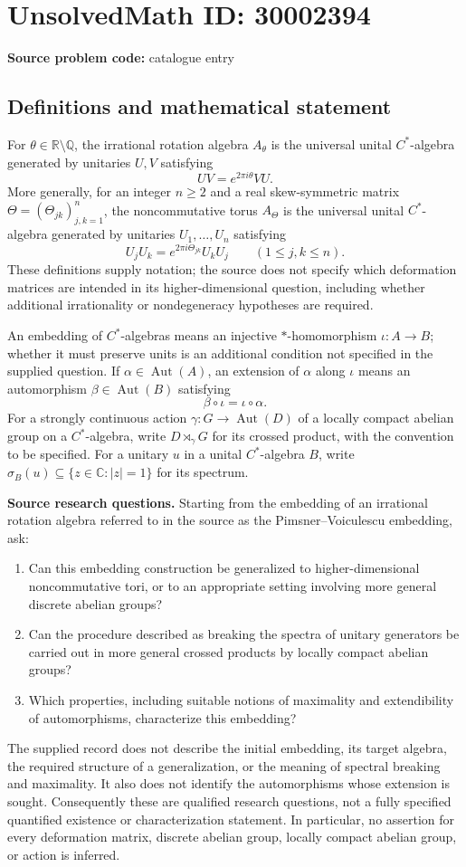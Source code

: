 \documentclass[11pt]{article}
\newcommand{\Q}{\mathbb{Q}}
\newcommand{\R}{\mathbb{R}}
\newcommand{\C}{\mathbb{C}}
\begin{document}
\section*{UnsolvedMath ID: 30002394}
\textbf{Source problem code:} catalogue entry
\subsection{Definitions and mathematical statement}
For \(\theta\in\R\setminus\Q\), the irrational rotation algebra \(A_\theta\) is the universal unital \(C^*\)-algebra generated by unitaries \(U,V\) satisfying
\[
UV=e^{2\pi i\theta}VU.
\]
More generally, for an integer \(n\geq 2\) and a real skew-symmetric matrix \(\Theta=(\Theta_{jk})_{j,k=1}^n\), the noncommutative torus \(A_\Theta\) is the universal unital \(C^*\)-algebra generated by unitaries \(U_1,\ldots,U_n\) satisfying
\[
U_jU_k=e^{2\pi i\Theta_{jk}}U_kU_j
\qquad(1\leq j,k\leq n).
\]
These definitions supply notation; the source does not specify which deformation matrices are intended in its higher-dimensional question, including whether additional irrationality or nondegeneracy hypotheses are required.

An embedding of \(C^*\)-algebras means an injective \(*\)-homomorphism \(\iota:A\to B\); whether it must preserve units is an additional condition not specified in the supplied question. If \(\alpha\in\operatorname{Aut}(A)\), an extension of \(\alpha\) along \(\iota\) means an automorphism \(\beta\in\operatorname{Aut}(B)\) satisfying
\[
\beta\circ\iota=\iota\circ\alpha.
\]
For a strongly continuous action \(\gamma:G\to\operatorname{Aut}(D)\) of a locally compact abelian group on a \(C^*\)-algebra, write \(D\rtimes_\gamma G\) for its crossed product, with the convention to be specified. For a unitary \(u\) in a unital \(C^*\)-algebra \(B\), write \(\sigma_B(u)\subseteq\{z\in\C:|z|=1\}\) for its spectrum.

\textbf{Source research questions.} Starting from the embedding of an irrational rotation algebra referred to in the source as the Pimsner--Voiculescu embedding, ask:
\begin{enumerate}
\item Can this embedding construction be generalized to higher-dimensional noncommutative tori, or to an appropriate setting involving more general discrete abelian groups?
\item Can the procedure described as breaking the spectra of unitary generators be carried out in more general crossed products by locally compact abelian groups?
\item Which properties, including suitable notions of maximality and extendibility of automorphisms, characterize this embedding?
\end{enumerate}
The supplied record does not describe the initial embedding, its target algebra, the required structure of a generalization, or the meaning of spectral breaking and maximality. It also does not identify the automorphisms whose extension is sought. Consequently these are qualified research questions, not a fully specified quantified existence or characterization statement. In particular, no assertion for every deformation matrix, discrete abelian group, locally compact abelian group, or action is inferred.
\end{document}
